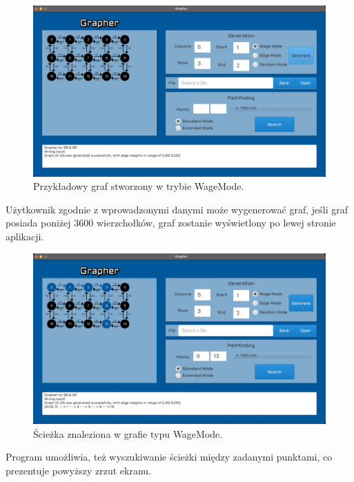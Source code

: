 \documentclass[10pt, a4paper]{report}
\begin{document}
\begin{figure}[h]
  \begin{center}
    \includegraphics[scale=0.165]{grapherWageModeGeneration.jpg}
    \caption{Przykładowy graf stworzony w trybie WageMode.}
  \end{center}
\end{figure}

Użytkownik zgodnie z wprowadzonymi danymi może wygenerować graf, jeśli graf
posiada poniżej 3600 wierzchołków, graf zostanie wyświetlony po lewej stronie
aplikacji.
\newpage

\begin{figure}[h]
  \begin{center}
    \includegraphics[scale=0.165]{grapherWageModeWithPath.jpg}
    \caption{Ścieżka znaleziona w grafie typu WageMode.}
  \end{center}
\end{figure}

Program umożliwia, też wyszukiwanie ścieżki między zadanymi punktami, co
prezentuje powyższy zrzut ekranu.
\newpage
\end{document}
